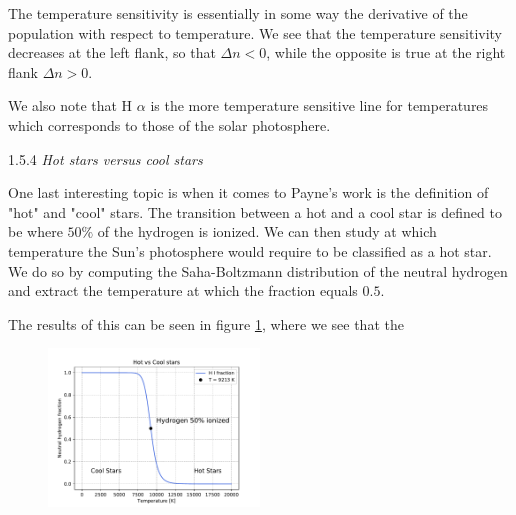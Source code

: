 \documentclass[a4paper,11.5pt,]{article}
\begin{document}
\begin{multicols}{2}
The temperature sensitivity is essentially in some way the derivative of the population with respect to temperature. We see that the temperature sensitivity decreases at the left flank, so that $\Delta n < 0$, while the opposite is true at the right flank $\Delta n > 0$.

We also note that H $\alpha$ is the more temperature sensitive line for temperatures which corresponds to those of the solar photosphere.

\begin{center}
1.5.4\textit{ Hot stars versus cool stars}
\end{center}

One last interesting topic is when it comes to Payne's work is the definition of "hot" and "cool" stars. The transition between a hot and a cool star is defined to be where $50\%$ of the hydrogen is ionized. We can then study at which temperature the Sun's photosphere would require to be classified as a hot star. We do so by computing the Saha-Boltzmann distribution of the neutral hydrogen and extract the temperature at which the fraction equals $0.5$.

The results of this can be seen in figure \ref{fig:11}, where we see that the 



\begin{figure}[H]
	\centering
	\includegraphics[width=0.5\textwidth]{SSA/figures/hotcool.pdf}
	\caption{}
	\label{fig:11}
\end{figure}

\end{multicols}
\end{document}
